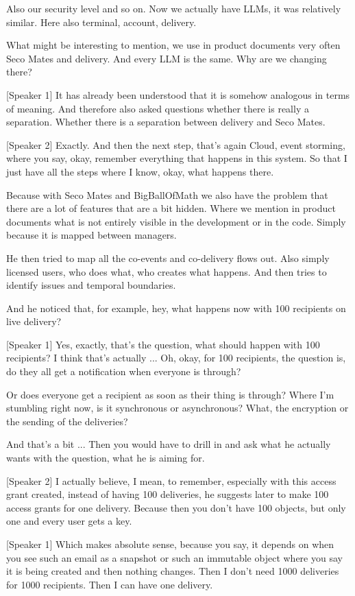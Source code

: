 Also our security level and so on. Now we actually have LLMs, it was relatively similar. Here also terminal, account, delivery.

What might be interesting to mention, we use in product documents very often Seco Mates and delivery. And every LLM is the same. Why are we changing there?

[Speaker 1]
It has already been understood that it is somehow analogous in terms of meaning. And therefore also asked questions whether there is really a separation. Whether there is a separation between delivery and Seco Mates.

[Speaker 2]
Exactly. And then the next step, that's again Cloud, event storming, where you say, okay, remember everything that happens in this system. So that I just have all the steps where I know, okay, what happens there.

Because with Seco Mates and BigBallOfMath we also have the problem that there are a lot of features that are a bit hidden. Where we mention in product documents what is not entirely visible in the development or in the code. Simply because it is mapped between managers.

He then tried to map all the co-events and co-delivery flows out. Also simply licensed users, who does what, who creates what happens. And then tries to identify issues and temporal boundaries.

And he noticed that, for example, hey, what happens now with 100 recipients on live delivery?

[Speaker 1]
Yes, exactly, that's the question, what should happen with 100 recipients? I think that's actually ... Oh, okay, for 100 recipients, the question is, do they all get a notification when everyone is through?

Or does everyone get a recipient as soon as their thing is through? Where I'm stumbling right now, is it synchronous or asynchronous? What, the encryption or the sending of the deliveries?

And that's a bit ... Then you would have to drill in and ask what he actually wants with the question, what he is aiming for.

[Speaker 2]
I actually believe, I mean, to remember, especially with this access grant created, instead of having 100 deliveries, he suggests later to make 100 access grants for one delivery. Because then you don't have 100 objects, but only one and every user gets a key.

[Speaker 1]
Which makes absolute sense, because you say, it depends on when you see such an email as a snapshot or such an immutable object where you say it is being created and then nothing changes. Then I don't need 1000 deliveries for 1000 recipients. Then I can have one delivery.

